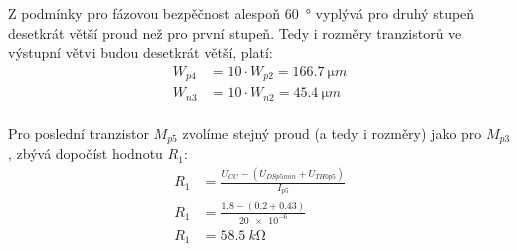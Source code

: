     Z podmínky pro fázovou bezpěčnost alespoň \qty{60}{\degree} vyplývá pro druhý stupeň desetkrát větší proud než pro první stupeň. Tedy i rozměry tranzistorů ve výstupní větvi budou desetkrát větší, platí:
    \begin{align*}
        W_{p4} &= 10\cdot W_{p2} = \qty{166.7}{\micro m} \\
        W_{n3} &= 10\cdot W_{n2} = \qty{45.4}{\micro m} \\
    \end{align*}

    Pro poslední tranzistor \(M_{p5} \) zvolíme stejný proud (a tedy i rozměry) jako pro \(M_{p3} \), zbývá dopočíst hodnotu \(R_{1}\):
    \begin{align*}
        R_{1} &= \frac{U_{CC} - (U_{DSp5min} + U_{TH0p5})  }{I_{p5} } \\
        R_{1} &= \frac{\num{1.8} - (\num{0.2} + \num{0.43}) }{\num{20e-6} } \\
        R_{1} &= \qty{58.5}{k\ohm}
    \end{align*}

    

    


    
